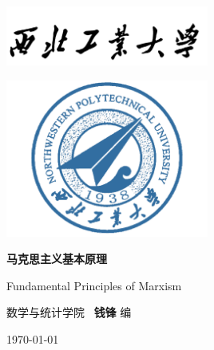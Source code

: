 \documentclass[10pt, UTF8]{book} %
\begin{document}
\pagestyle{empty}
\begin{titlepage}
    \thispagestyle{empty}
    \centering
        \vspace*{2cm}
        \includegraphics[width=0.5\textwidth]{pic/npu_2.png}\par
        \vspace{1em}
        \includegraphics[width=0.5\textwidth]{pic/npu_1.png}\par
    \vspace{1em}
        \begin{center}
            \Huge \heiti \textbf{马克思主义基本原理}

            Fundamental Principles of Marxism
        \end{center}
        \vspace{16em}
        \begin{center}
        \songti
        \kaishu 数学与统计学院 \, \heiti\textbf{钱锋} \quad \songti 编
        \vspace{0.5em}

    \today
    \end{center}
\end{titlepage}

\cleardoublepage
\maketitle
\cleardoublepage

\frontmatter
\newpage
\pagestyle{plain}
\makeatother

\pagestyle{plain}
{\tableofcontents}
\newpage
\thispagestyle{empty}
\cleardoublepage %
\end{document}
